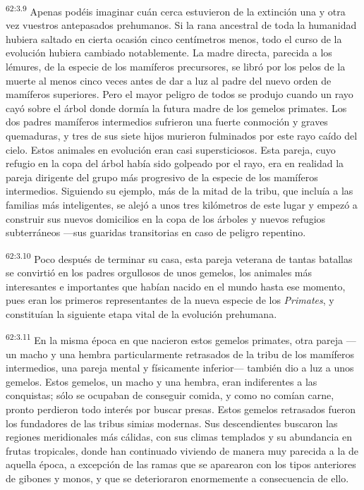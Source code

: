 \par
\textsuperscript{62:3.9} Apenas podéis imaginar cuán cerca estuvieron de la extinción una y otra vez vuestros antepasados prehumanos. Si la rana ancestral de toda la humanidad hubiera saltado en cierta ocasión cinco centímetros menos, todo el curso de la evolución hubiera cambiado notablemente. La madre directa, parecida a los lémures, de la especie de los mamíferos precursores, se libró por los pelos de la muerte al menos cinco veces antes de dar a luz al padre del nuevo orden de mamíferos superiores. Pero el mayor peligro de todos se produjo cuando un rayo cayó sobre el árbol donde dormía la futura madre de los gemelos primates. Los dos padres mamíferos intermedios sufrieron una fuerte conmoción y graves quemaduras, y tres de sus siete hijos murieron fulminados por este rayo caído del cielo. Estos animales en evolución eran casi supersticiosos. Esta pareja, cuyo refugio en la copa del árbol había sido golpeado por el rayo, era en realidad la pareja dirigente del grupo más progresivo de la especie de los mamíferos intermedios. Siguiendo su ejemplo, más de la mitad de la tribu, que incluía a las familias más inteligentes, se alejó a unos tres kilómetros de este lugar y empezó a construir sus nuevos domicilios en la copa de los árboles y nuevos refugios subterráneos ---sus guaridas transitorias en caso de peligro repentino.

\par
\textsuperscript{62:3.10} Poco después de terminar su casa, esta pareja veterana de tantas batallas se convirtió en los padres orgullosos de unos gemelos, los animales más interesantes e importantes que habían nacido en el mundo hasta ese momento, pues eran los primeros representantes de la nueva especie de los \textit{Primates}, y constituían la siguiente etapa vital de la evolución prehumana.

\par
\textsuperscript{62:3.11} En la misma época en que nacieron estos gemelos primates, otra pareja ---un macho y una hembra particularmente retrasados de la tribu de los mamíferos intermedios, una pareja mental y físicamente inferior--- también dio a luz a unos gemelos. Estos gemelos, un macho y una hembra, eran indiferentes a las conquistas; sólo se ocupaban de conseguir comida, y como no comían carne, pronto perdieron todo interés por buscar presas. Estos gemelos retrasados fueron los fundadores de las tribus simias modernas. Sus descendientes buscaron las regiones meridionales más cálidas, con sus climas templados y su abundancia en frutas tropicales, donde han continuado viviendo de manera muy parecida a la de aquella época, a excepción de las ramas que se aparearon con los tipos anteriores de gibones y monos, y que se deterioraron enormemente a consecuencia de ello.


